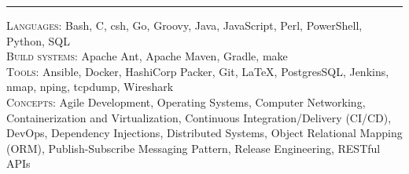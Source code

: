 \documentclass{res}
\begin{document}
\begin{resume}
\hrule width18.5cm
\textsc{Languages:} Bash, C, csh, Go, Groovy, Java, JavaScript, Perl, PowerShell, Python, SQL\\[2mm]
\textsc{Build systems:} Apache Ant, Apache Maven, Gradle, make\\[2mm]
\textsc{Tools:} Ansible, Docker, HashiCorp Packer, Git, \LaTeX, PostgresSQL, Jenkins, nmap, nping, tcpdump, Wireshark\\[2mm]
\textsc{Concepts:} Agile Development, Operating Systems, Computer Networking, Containerization and Virtualization, Continuous Integration/Delivery (CI/CD), DevOps, Dependency Injections, Distributed Systems, Object Relational Mapping (ORM), Publish-Subscribe Messaging Pattern, Release Engineering, RESTful APIs\\[0.5mm]
\vspace{-2mm}
\end{resume}
\end{document}
